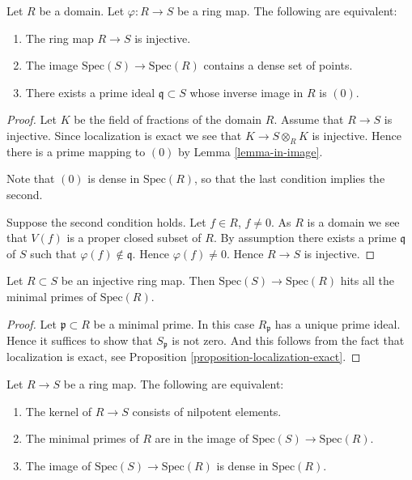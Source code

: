 \begin{lemma}
\label{lemma-domain-image-dense-set-points-generic-point}
Let $R$ be a domain. Let $\varphi : R \to S$ be a ring map.
The following are equivalent:
\begin{enumerate}
\item The ring map $R \to S$ is injective.
\item The image $\text{Spec}(S) \to \text{Spec}(R)$
contains a dense set of points.
\item There exists a prime ideal $\mathfrak q \subset S$
whose inverse image in $R$ is $(0)$.
\end{enumerate}
\end{lemma}

\begin{proof}
Let $K$ be the field of fractions of the domain $R$.
Assume that $R \to S$ is injective. Since localization
is exact we see that $K \to S \otimes_R K$ is injective.
Hence there is a prime mapping to $(0)$ by
Lemma \ref{lemma-in-image}.

\medskip\noindent
Note that $(0)$ is dense in $\text{Spec}(R)$, so that the
last condition implies the second.

\medskip\noindent
Suppose the second condition holds. Let $f \in R$,
$f \not = 0$. As $R$ is a domain we see that $V(f)$
is a proper closed subset of $R$. By assumption
there exists a prime $\mathfrak q$
of $S$ such that $\varphi(f) \not \in \mathfrak q$.
Hence $\varphi(f) \not = 0$.
Hence $R \to S$ is injective.
\end{proof}

\begin{lemma}
\label{lemma-injective-minimal-primes-in-image}
Let $R \subset S$ be an injective ring map.
Then $\text{Spec}(S) \to \text{Spec}(R)$
hits all the minimal primes of $\text{Spec}(R)$.
\end{lemma}

\begin{proof}
Let $\mathfrak p \subset R$ be a minimal prime.
In this case $R_{\mathfrak p}$ has a unique prime ideal.
Hence it suffices to show that $S_{\mathfrak p}$ is not zero.
And this follows from the fact that localization is exact,
see Proposition \ref{proposition-localization-exact}.
\end{proof}

\begin{lemma}
\label{lemma-image-dense-generic-points}
Let $R \to S$ be a ring map. The following are equivalent:
\begin{enumerate}
\item The kernel of $R \to S$ consists of nilpotent elements.
\item The minimal primes of $R$ are in the image of
$\text{Spec}(S) \to \text{Spec}(R)$.
\item The image of $\text{Spec}(S) \to \text{Spec}(R)$ is dense
in $\text{Spec}(R)$.
\end{enumerate}
\end{lemma}

